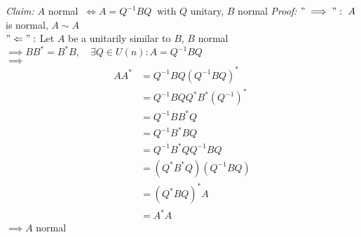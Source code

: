 
\begin{SolutionSheet}[\ref{sheet2}]

  \begin{Solution}
    \textit{Claim:} $A$ normal $\ \iff A = Q^{-1}BQ \ $ with $Q$ unitary, $B$ normal
    \textit{Proof:} $"\implies ": \ A$ is normal, $A \sim A$ \\
    $"\Leftarrow ":$ Let $A$ be a unitarily similar to $B$, $B$ normal \\
    $ \implies BB^* = B^*B, \quad\exists Q \in U(n): A = Q^{-1}BQ$ \\
    $ \implies$ \begin{align*}
      AA^* &= Q^{-1}BQ(Q^{-1}BQ)^* \\
      &= Q^{-1}BQ Q^* B^* (Q^{-1})^* \\
      &= Q^{-1} BB^*Q \\
      &= Q^{-1} B^*BQ \\
      &= Q^{-1} B^* QQ^{-1}BQ \\
      &= (Q^* B^* Q)(Q^{-1}BQ) \\
      &= (Q^* B Q)^* A \\
      &= A^* A
    \end{align*}
    $ \implies A$ normal
  \end{Solution}


\end{SolutionSheet}

